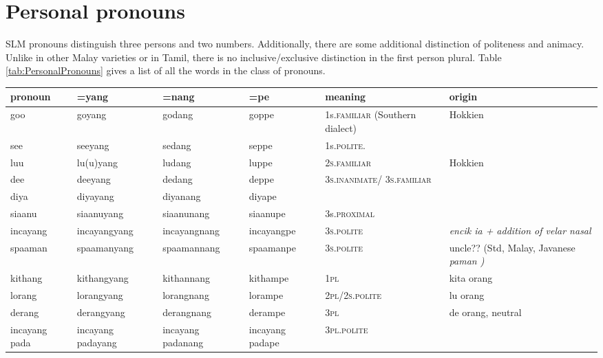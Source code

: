 \section{Personal pronouns}\label{sec:wc:Personalpronouns}
SLM pronouns distinguish   three persons and two numbers. Additionally, there are some additional distinction of politeness and animacy. Unlike in other Malay varieties or in Tamil, there is no inclusive/exclusive distinction in the first person plural.
Table \ref{tab:PersonalPronouns} gives a list of all the words in the class of pronouns.

\begin{sidewaystable}
	\begin{center}
	\begin{tabular}{llllp{2cm}p{3cm}}
	pronoun &  =yang & =nang &=pe	& meaning & origin\\
\hline
	goo 	& goyang   	& godang & goppe 	& 1s.\textsc{familiar} (Southern dialect)& Hokkien \citep{Adelaar1991,Ansaldo2005ms} \\
	see 	& seeyang 	& sedang & seppe	& 1s.\textsc{polite}. \\
	luu 	& lu(u)yang	& ludang & luppe	& \textsc{2s.familiar} & Hokkien \citep{Adelaar1991,Ansaldo2005ms} \\
	dee 	& deeyang 	& dedang & deppe 	& \textsc{3s.inanimate}/ \textsc{3s.familiar} & \\%
	diya	& diyayang	& diyanang & diyape	& \\%
	siaanu  & siaanuyang   	& siaanunang & siaanupe	& 3s.\textsc{proximal} \\
	incayang  & incayangyang & incayangnang	& incayangpe & \textsc{3s.polite} & \em encik ia \em + addition of velar nasal \formref{sec:phon:Finalvelarizationofnasals} \citep{Slomanson2008ismil} \\
	spaaman & spaamanyang  	& spaamannang 	& spaamanpe & \textsc{3s.polite} & uncle?? (Std, Malay, Javanese \em paman \em \citep[141]{Adelaar1985})\\
	kithang & kithangyang  	& kithannang 	& kithampe &\textsc{1pl} & \lt *kita orang\\
	lorang\footnotemark  	& lorangyang 	& lorangnang &lorampe	& \textsc{2pl}/\textsc{2s.polite} & \lt *lu orang \\
	derang  &  derangyang	& derangnang 	& derampe & \textsc{3pl} &\lt *de orang, neutral\\
	incayang pada & incayang padayang 	& incayang padanang 	& incayang padape & \textsc{3pl.polite} \\
	\end{tabular}
	\end{center}
	\caption[Pronouns]{Pronouns.  The etymology of the plural pronouns includes a contraction of  to \em rang \em \citep{AdelaarEtAl1996,Adelaar2005struct%
        ,Adelaar1991}%
 	}
	\label{tab:PersonalPronouns}
\end{sidewaystable}

